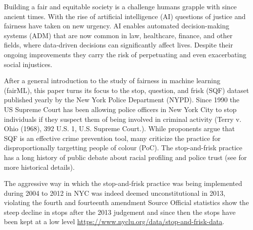 
Building a fair and equitable society is a challenge humans grapple with since ancient times. With the rise of artificial intelligence (AI) questions of justice and fairness have taken on new urgency. AI enables automated decision-making systems (ADM) that are now common in law, healthcare, finance, and other fields, where data-driven decisions can significantly affect lives. Despite their ongoing improvements they carry the risk of perpetuating and even exacerbating social injustices. 



After a general introduction to the study of fairness in machine learning (fairML), this paper turns its focus to the stop, question, and frisk (SQF) dataset published yearly by the New York Police Department (NYPD). Since 1990 the US Supreme Court has been allowing police officers in New York City to stop individuals if they suspect them of being involved in criminal activity (Terry v. Ohio (1968), 392 U.S. 1, U.S. Supreme Court.). While proponents argue that SQF is an effective crime prevention tool, many criticize the practice for disproportionally targetting people of colour (PoC). The stop-and-frisk practice has a long history of public debate about racial profiling and police trust (see \cite{gelman2007} for more historical details).

The aggressive way in which the stop-and-frisk practice was being implemented during 2004 to 2012 in NYC was indeed deemed unconstitutional in 2013, violating the fourth and fourteenth amendment {\color{red} Source}
Official statistics show the steep decline in stops after the 2013 judgement and since then the stops have been kept at a low level \href{https://www.nyclu.org/data/stop-and-frisk-data}{https://www.nyclu.org/data/stop-and-frisk-data}.

